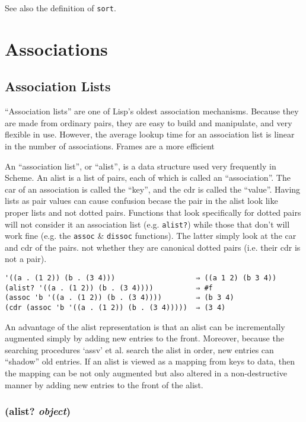 \documentclass{article}
\begin{document}
See also the definition of \verb|sort|.

\section{Associations}\label{sec:associations}

\subsection{Association Lists}\label{sec:association-lists}

``Association lists'' are one of Lisp's oldest association mechanisms. Because they are made
from ordinary pairs, they are easy to build and manipulate, and very flexible in use. However,
the average lookup time for an association list is linear in the number of associations.
Frames are a more efficient

An ``association list'', or ``alist'', is a data structure used very frequently in Scheme. An
alist is a list of pairs, each of which is called an ``association''. The car of an
association is called the ``key'', and the cdr is called the ``value''. Having lists as pair
values can cause confusion becase the pair in the alist look like proper lists and not dotted
pairs. Functions that look specifically for dotted pairs will not consider it an association
list (e.g. \verb|alist?|) while those that don't will work fine (e.g. the \verb|assoc| \&
\verb|dissoc| functions). The latter simply look at the car and cdr of the pairs. not
whether they are canonical dotted pairs (i.e. their cdr is not a pair).

\begin{verbatim}
'((a . (1 2)) (b . (3 4)))                   ⇒ ((a 1 2) (b 3 4))
(alist? '((a . (1 2)) (b . (3 4))))          ⇒ #f
(assoc 'b '((a . (1 2)) (b . (3 4))))        ⇒ (b 3 4)
(cdr (assoc 'b '((a . (1 2)) (b . (3 4)))))  ⇒ (3 4)
\end{verbatim}

An advantage of the alist representation is that an alist can be incrementally augmented
simply by adding new entries to the front. Moreover, because the searching procedures `assv'
et al. search the alist in order, new entries can ``shadow'' old entries. If an alist is
viewed as a mapping from keys to data, then the mapping can be not only augmented but also
altered in a non-destructive manner by adding new entries to the front of the alist.

\subsubsection{(alist? \emph{object})}
\end{document}
